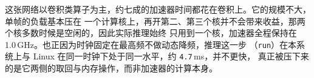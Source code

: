这张网络以卷积类算子为主，约七成的加速器时间都花在卷积上。它的规模不大，单帧的负载基本压在
一个计算核上，再开第二、第三个核并不会带来收益，那两个核多数时候是空闲的，因此实际推理始终
只用到一个核，加速器全程保持在 1.0\,GHz。也正因为时钟固定在最高频不做动态降频，推理这一步
（\texttt{run}）在本系统上与 Linux 在同一时钟下处于同一水平，约 \texttt{4.7}\,ms，并不更快，
真正被压下来的是它两侧的取回与内存操作，而非加速器的计算本身。

